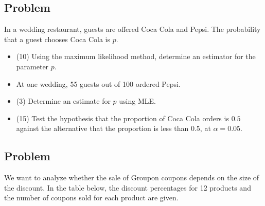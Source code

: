 \documentclass[a4paper, 12pt]{article}
\begin{document}
\subsection{Problem}
In a wedding restaurant, guests are offered Coca Cola and Pepsi. The probability that a guest chooses Coca Cola is $p$.

\begin{itemize}
  \item [a)] (10) Using the maximum likelihood method, determine an estimator for the parameter $p$.
\item [b)] At one wedding, 55 guests out of 100 ordered Pepsi.
\item [b1)] (3) Determine an estimate for $p$ using MLE.
\item [b2)] (15) Test the hypothesis that the proportion of Coca Cola orders is $0.5$ against the alternative that the proportion is less than 0.5, at $\alpha = 0.05$.
\end{itemize}


\subsection{Problem}
We want to analyze whether the sale of Groupon coupons depends on the size of the discount. In the table below, the discount percentages for 12 products and the number of coupons sold for each product are given.

\begin{table}[h!]
\centering
{}
\end{table}
\end{document}
